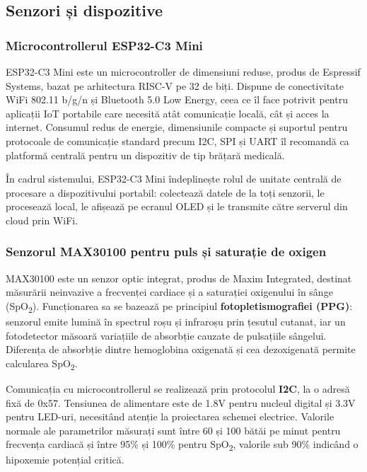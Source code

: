 ﻿\documentclass[12pt,a4paper,twoside]{article}
\newcommand{\spo}{SpO\textsubscript{2}}
\begin{document}
\subsection{Senzori și dispozitive}

\subsubsection{Microcontrollerul ESP32-C3 Mini}

ESP32-C3 Mini este un microcontroller de dimensiuni reduse, produs de Espressif Systems, bazat pe arhitectura RISC-V pe 32 de biți. Dispune de conectivitate WiFi 802.11 b/g/n și Bluetooth 5.0 Low Energy, ceea ce îl face potrivit pentru aplicații IoT portabile care necesită atât comunicație locală, cât și acces la internet. Consumul redus de energie, dimensiunile compacte și suportul pentru protocoale de comunicație standard precum I2C, SPI și UART îl recomandă ca platformă centrală pentru un dispozitiv de tip brățară medicală.

În cadrul sistemului, ESP32-C3 Mini îndeplinește rolul de unitate centrală de procesare a dispozitivului portabil: colectează datele de la toți senzorii, le procesează local, le afișează pe ecranul OLED și le transmite către serverul din cloud prin WiFi.

\subsubsection{Senzorul MAX30100 pentru puls și saturație de oxigen}

MAX30100 este un senzor optic integrat, produs de Maxim Integrated, destinat măsurării neinvazive a frecvenței cardiace și a saturației oxigenului în sânge (\spo). Funcționarea sa se bazează pe principiul \textbf{fotopletismografiei (PPG)}: senzorul emite lumină în spectrul roșu și infraroșu prin țesutul cutanat, iar un fotodetector măsoară variațiile de absorbție cauzate de pulsațiile sângelui. Diferența de absorbție dintre hemoglobina oxigenată și cea dezoxigenată permite calcularea \spo.

Comunicația cu microcontrollerul se realizează prin protocolul \textbf{I2C}, la o adresă fixă de 0x57. Tensiunea de alimentare este de 1.8V pentru nucleul digital și 3.3V pentru LED-uri, necesitând atenție la proiectarea schemei electrice. Valorile normale ale parametrilor măsurați sunt între 60 și 100 bătăi pe minut pentru frecvența cardiacă și între 95\% și 100\% pentru \spo, valorile sub 90\% indicând o hipoxemie potențial critică.
\end{document}
